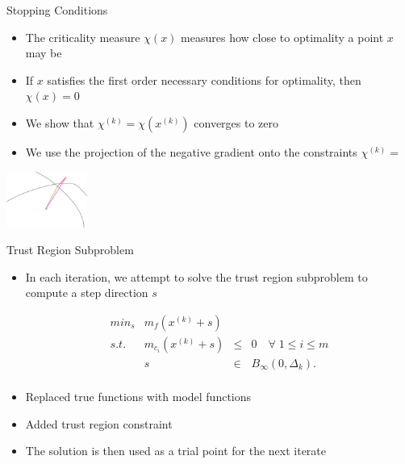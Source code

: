 \documentclass{beamer}
\newcommand{\xk}{{{x}^{(k)}}}
\newcommand{\dk}{{\Delta_k}}
\newcommand{\mk}{{m_f}}
\newcommand{\mck}{{m_{c_i}}}
\begin{document}
\begin{frame}{Stopping Conditions}
	\begin{itemize}
		\item The criticality measure $\chi\left(x\right)$ measures how close to optimality a point $x$ may be
		\item If $x$ satisfies the first order necessary conditions for optimality, then $\chi(x) = 0$
		\item We show that $\chi^{(k)} = \chi\left(\xk\right)$ converges to zero
		\item We use the projection of the negative gradient onto the constraints
			$\chi^{(k)} = $
	\end{itemize}
	\begin{center}
		\includegraphics[width=100px]{images/criticality.png}
	\end{center}
\end{frame}

\begin{frame}{Trust Region Subproblem}
	\begin{itemize}
		\item In each iteration, we attempt to solve the trust region subproblem to compute a step direction $s$

		\begin{displaymath}
\begin{array}{lrcc}
min_s & \mk(\xk + s)   &	 &			\\
s.t.  &  \mck(\xk + s) & \le & 0   \quad \forall \; 1 \le i \le m	   \\
	  &  s & \in & B_{\infty}(0, \dk).  \\
\end{array}
		\end{displaymath}
		\item Replaced true functions with model functions
		\item Added trust region constraint
		\item The solution is then used as a trial point for the next iterate
	\end{itemize}
\end{frame}
\end{document}
